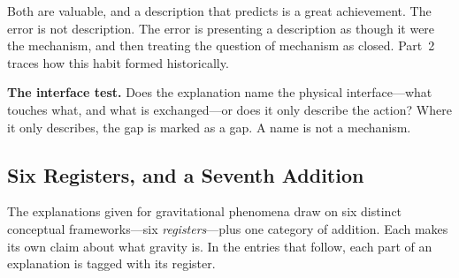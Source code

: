 \documentclass[11pt,a4paper]{article}
\begin{document}
Both are valuable, and a description that predicts is a great achievement. The error is not description. The error is presenting a description as though it were the mechanism, and then treating the question of mechanism as closed. Part~2 traces how this habit formed historically.

\begin{tcolorbox}[colback=black!3,colframe=black!25,boxrule=0.4pt,arc=2pt,left=8pt,right=8pt,top=6pt,bottom=6pt]
\textbf{The interface test.} Does the explanation name the physical interface---what touches what, and what is exchanged---or does it only describe the action? Where it only describes, the gap is marked as a gap. A name is not a mechanism.
\end{tcolorbox}

\subsection{Six Registers, and a Seventh Addition}

The explanations given for gravitational phenomena draw on six distinct conceptual frameworks---six \emph{registers}---plus one category of addition. Each makes its own claim about what gravity is. In the entries that follow, each part of an explanation is tagged with its register.
\end{document}

